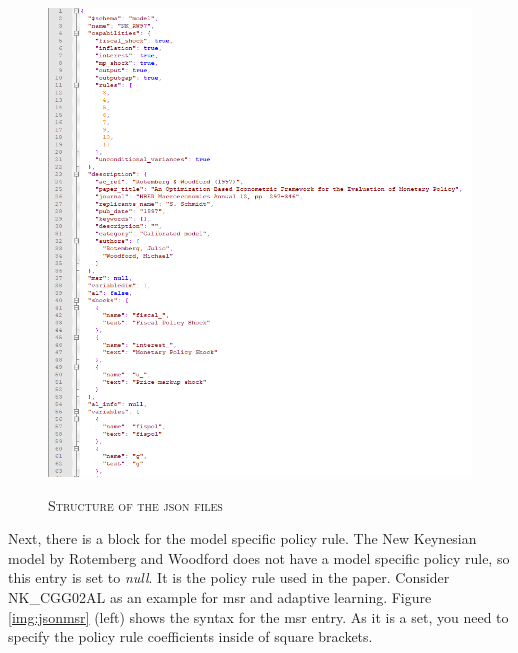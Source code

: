 \begin{figure}[H]
	\centering
	\caption{\textsc{Structure of the json files}}
	\vspace{0.2cm}
	\includegraphics[width=15cm,keepaspectratio]{json1.png}\\
	\label{img:jsonstructure}
\end{figure}

Next, there is a block for the model specific policy rule. The New Keynesian model by Rotemberg and Woodford does not have a model specific policy rule, so this entry is set to \textit{null}. It is the policy rule used in the paper. Consider NK\_CGG02AL as an example for msr and adaptive learning. Figure \ref{img:jsonmsr} (left) shows the syntax for the msr entry. As it is a set, you need to specify the policy rule coefficients inside of square brackets.

